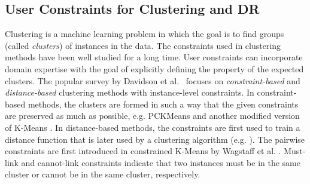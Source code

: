 \subsection{User Constraints for Clustering and DR}\label{subsec:user_constraints_clustering_DR}

Clustering is a machine learning problem in which the goal is to find groups (called \emph{clusters}) of instances in the data. The constraints used in clustering methods have been well studied for a long time. User constraints can incorporate domain expertise with the goal of explicitly defining the property of the expected clusters.
The popular survey by Davidson et al.~\cite{Davidson2007surveyClt} focuses on \emph{constraint-based} and \emph{distance-based} clustering methods with instance-level constraints.
In constraint-based methods, the clusters are formed in such a way that the given constraints are preserved as much as possible, e.g. PCKMeans \cite{basu2004active} and another modified version of K-Means \cite{davidson2005clustering}. %
In distance-based methods, the constraints are first used to train a distance function that is later used by a clustering algorithm (e.g. \cite{bar2003learning,xing2003distance}). %
The pairwise constraints are first introduced in constrained K-Means by Wagstaff et al. \cite{wagstaff2001constrained}. Must-link and cannot-link constraints indicate that two instances must be in the same cluster or cannot be in the same cluster, respectively.

